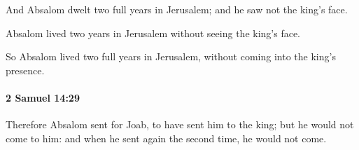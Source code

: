 			\begin{versebox}
					\item[BHS] 
					\item[ASV] And Absalom dwelt two full years in Jerusalem; and he saw not the king's face.
					\item[NIV] Absalom lived two years in Jerusalem without seeing the king’s face.
					\item[NRSV] So Absalom lived two full years in Jerusalem, without coming into the king’s presence.
			\end{versebox}

		\paragraph{2 Samuel 14:29} %
			\label{2SAMUEL-14-29}

			Therefore Absalom sent for Joab, to have sent him to the king; but he would not come to him: and when he sent again the second time, he would not come.

